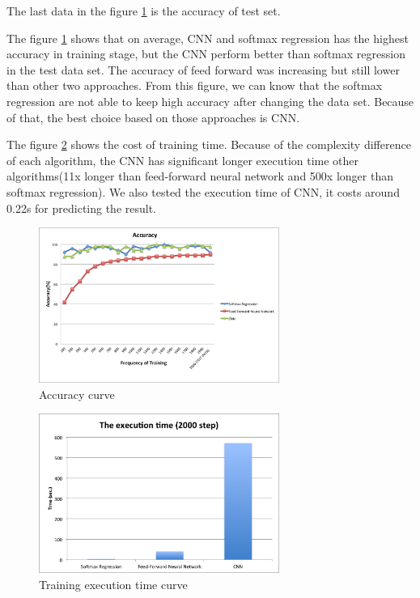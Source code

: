 \documentclass[article]{aaltoseries}
\begin{document}
The last data in the figure \ref{fig:accuracy} is the accuracy of test set.

The figure \ref{fig:accuracy} shows that on average, CNN and softmax regression has the highest accuracy in training stage, 
but the CNN perform better than softmax regression in the test data set.
The accuracy of feed forward was increasing but still lower than other two approaches.
From this figure, we can know that the softmax regression are not able to keep high accuracy after changing the data set.
Because of that, the best choice based on those approaches is CNN.

The figure \ref{fig:execution_time} shows the cost of training time. Because of the complexity difference of each algorithm,
the CNN has significant longer execution time other algorithms(11x longer than feed-forward neural network and 500x longer than softmax regression). 
We also tested the execution time of CNN, it costs around 0.22s for predicting the result.



\begin{figure}[t!]
  \begin{center}
    \includegraphics[width=0.7\textwidth]{figures/accuracy}
    \caption{Accuracy curve}
    \label{fig:accuracy}
  \end{center}
\end{figure}

\begin{figure}[t!]
  \begin{center}
    \includegraphics[width=0.7\textwidth]{figures/execution_time}
    \caption{Training execution time curve}
    \label{fig:execution_time}
  \end{center}
\end{figure}
\end{document}
